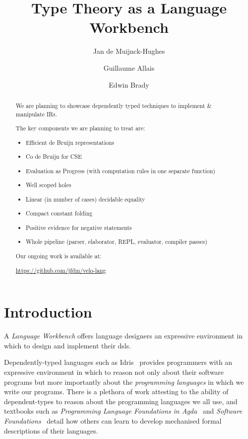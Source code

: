 \documentclass[%
draft, %
a4paper,
UKenglish,
cleveref,
autoref,
thm-restate,
pdfa
]{oasics-v2021}
\title{Type Theory as a Language Workbench} %
\author
{Jan {de Muijnck-Hughes}}
{University of Glasgow, UK}
{Jan.deMuijnck-Hughes@glasgow.ac.uk}
{https://orcid.org/0000-0003-2185-8543}
{} %
\author
{Guillaume Allais}
{University of St Andrews, UK}
{gxa1@st-andrews.ac.uk} %
{https://orcid.org/0000-0002-4091-657X} %
{} %
\author
{Edwin Brady}
{University of St Andrews, UK}
{ecb10@st-andrews.ac.uk} %
{} %
{} %
\begin{document}
\maketitle


\begin{abstract}
We are planning to showcase dependently typed techniques to implement \& manipulate IRs.

The key components we are planning to treat are:

\begin{itemize}
\item Efficient de Bruijn representations
\item Co de Bruijn for CSE
\item Evaluation as Progress (with computation rules in one separate function)
\item Well scoped holes
\item Linear (in number of cases) decidable equality
\item Compact constant folding
\item Positive evidence for negative statements
\item Whole pipeline (parser, elaborator, REPL, evaluator, compiler passes)
\end{itemize}

Our ongoing work is available at:

\url{https://github.com/jfdm/velo-lang}
\end{abstract}

\section{Introduction}
\label{sec:introduction}

A \emph{Language Workbench} offers language designers an expressive environment in which to design and implement their \Acp{dsl}.

Dependently-typed languages such as Idris~\cite{DBLP:conf/ecoop/Brady21} provides programmers with an expressive environment in which to reason not only about their software programs but more importantly about the \emph{programming languages} in which we write our programs.
There is a plethora of work attesting to the ability of dependent-types to reason about the programming languages we all use, and textbooks such as \emph{Programming Language Foundations in Agda}~\cite{plfa22.08} and \emph{Software Foundations}~\cite{Pierce:SF2} detail how others can learn to develop mechanised formal descriptions of their languages.
\end{document}
